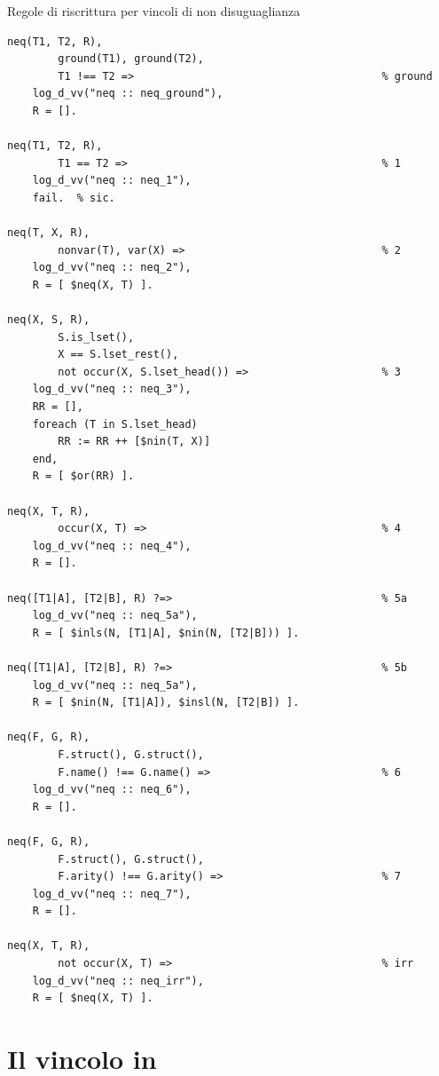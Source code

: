 \documentclass[12pt,a4paper,openright]{book}  %
\begin{document}
\begin{algorithm}[H]
	\caption{Regole di riscrittura per vincoli di non disuguaglianza}
	\label{alg:neq_constraints}
\end{algorithm}
\begin{verbatim}
neq(T1, T2, R),
        ground(T1), ground(T2),
    	T1 !== T2 =>                                       % ground
    log_d_vv("neq :: neq_ground"),
    R = [].

neq(T1, T2, R),
        T1 == T2 =>                                        % 1
    log_d_vv("neq :: neq_1"),
    fail.  % sic.

neq(T, X, R),
       	nonvar(T), var(X) =>                               % 2
    log_d_vv("neq :: neq_2"),
    R = [ $neq(X, T) ].

neq(X, S, R),
        S.is_lset(),
        X == S.lset_rest(),
        not occur(X, S.lset_head()) =>                     % 3
    log_d_vv("neq :: neq_3"),
    RR = [],
    foreach (T in S.lset_head)
        RR := RR ++ [$nin(T, X)]
    end,
    R = [ $or(RR) ].

neq(X, T, R),
       	occur(X, T) =>                                     % 4
    log_d_vv("neq :: neq_4"),
    R = [].

neq([T1|A], [T2|B], R) ?=>                                 % 5a
    log_d_vv("neq :: neq_5a"),
    R = [ $inls(N, [T1|A], $nin(N, [T2|B])) ].

neq([T1|A], [T2|B], R) ?=>                                 % 5b
    log_d_vv("neq :: neq_5a"),
    R = [ $nin(N, [T1|A]), $insl(N, [T2|B]) ].

neq(F, G, R),
        F.struct(), G.struct(),
        F.name() !== G.name() =>                           % 6
    log_d_vv("neq :: neq_6"),
    R = [].

neq(F, G, R),
        F.struct(), G.struct(),
        F.arity() !== G.arity() =>                         % 7
    log_d_vv("neq :: neq_7"),
    R = [].

neq(X, T, R),
        not occur(X, T) =>                                 % irr
    log_d_vv("neq :: neq_irr"),
    R = [ $neq(X, T) ].
\end{verbatim}

\section{Il vincolo in}
\end{document}
